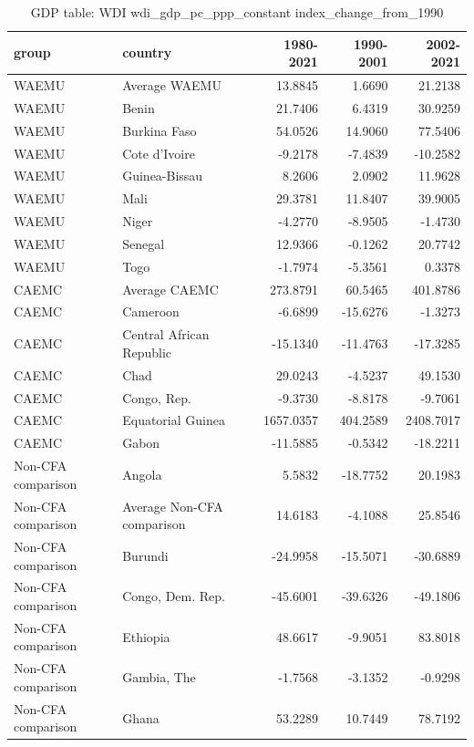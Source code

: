 \begin{table}

\caption{GDP table: WDI wdi_gdp_pc_ppp_constant index_change_from_1990}
\centering
\begin{tabular}[t]{llrrr}
\toprule
group & country & 1980-2021 & 1990-2001 & 2002-2021\\
\midrule
WAEMU & Average WAEMU & 13.8845 & 1.6690 & 21.2138\\
WAEMU & Benin & 21.7406 & 6.4319 & 30.9259\\
WAEMU & Burkina Faso & 54.0526 & 14.9060 & 77.5406\\
WAEMU & Cote d'Ivoire & -9.2178 & -7.4839 & -10.2582\\
WAEMU & Guinea-Bissau & 8.2606 & 2.0902 & 11.9628\\
\addlinespace
WAEMU & Mali & 29.3781 & 11.8407 & 39.9005\\
WAEMU & Niger & -4.2770 & -8.9505 & -1.4730\\
WAEMU & Senegal & 12.9366 & -0.1262 & 20.7742\\
WAEMU & Togo & -1.7974 & -5.3561 & 0.3378\\
CAEMC & Average CAEMC & 273.8791 & 60.5465 & 401.8786\\
\addlinespace
CAEMC & Cameroon & -6.6899 & -15.6276 & -1.3273\\
CAEMC & Central African Republic & -15.1340 & -11.4763 & -17.3285\\
CAEMC & Chad & 29.0243 & -4.5237 & 49.1530\\
CAEMC & Congo, Rep. & -9.3730 & -8.8178 & -9.7061\\
CAEMC & Equatorial Guinea & 1657.0357 & 404.2589 & 2408.7017\\
\addlinespace
CAEMC & Gabon & -11.5885 & -0.5342 & -18.2211\\
Non-CFA comparison & Angola & 5.5832 & -18.7752 & 20.1983\\
Non-CFA comparison & Average Non-CFA comparison & 14.6183 & -4.1088 & 25.8546\\
Non-CFA comparison & Burundi & -24.9958 & -15.5071 & -30.6889\\
Non-CFA comparison & Congo, Dem. Rep. & -45.6001 & -39.6326 & -49.1806\\
\addlinespace
Non-CFA comparison & Ethiopia & 48.6617 & -9.9051 & 83.8018\\
Non-CFA comparison & Gambia, The & -1.7568 & -3.1352 & -0.9298\\
Non-CFA comparison & Ghana & 53.2289 & 10.7449 & 78.7192\\

\end{tabular}
\end{table}
